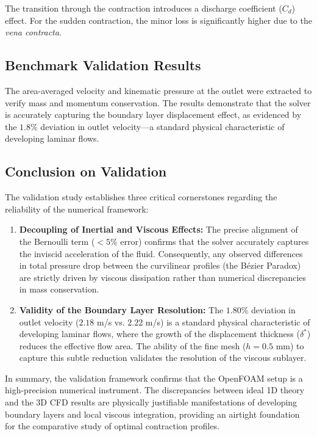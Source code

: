 \documentclass[12pt, a4paper]{article}
\begin{document}
The transition through the contraction introduces a discharge coefficient ($C_d$) effect. For the sudden contraction, the minor loss is significantly higher due to the \textit{vena contracta}.

\subsection{Benchmark Validation Results}

The area-averaged velocity and kinematic pressure at the outlet were extracted to verify mass and momentum conservation. The results demonstrate that the solver is accurately capturing the boundary layer displacement effect, as evidenced by the $1.8\%$ deviation in outlet velocity—a standard physical characteristic of developing laminar flows.

\subsection{Conclusion on Validation}

The validation study establishes three critical cornerstones regarding the reliability of the numerical framework:

\begin{enumerate}
	\item \textbf{Decoupling of Inertial and Viscous Effects:} The precise alignment of the Bernoulli term ($< 5\%$ error) confirms that the solver accurately captures the inviscid acceleration of the fluid. Consequently, any observed differences in total pressure drop between the curvilinear profiles (the B\'{e}zier Paradox) are strictly driven by viscous dissipation rather than numerical discrepancies in mass conservation.
	\item \textbf{Validity of the Boundary Layer Resolution:} The $1.80\%$ deviation in outlet velocity ($2.18$ m/s vs. $2.22$ m/s) is a standard physical characteristic of developing laminar flows, where the growth of the displacement thickness ($\delta^*$) reduces the effective flow area. The ability of the fine mesh ($h = 0.5$ mm) to capture this subtle reduction validates the resolution of the viscous sublayer\cite{anderson2020}.
	
\end{enumerate}

In summary, the validation framework confirms that the OpenFOAM setup is a high-precision numerical instrument. The discrepancies between ideal 1D theory and the 3D CFD results are physically justifiable manifestations of developing boundary layers and local viscous integration, providing an airtight foundation for the comparative study of optimal contraction profiles.
\end{document}
